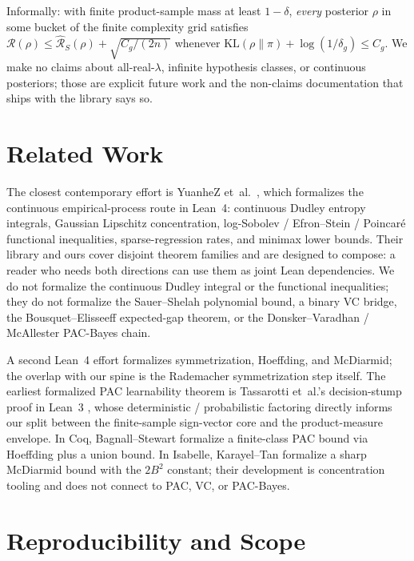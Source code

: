 \documentclass[10pt,twocolumn,letterpaper]{article}
\newcommand{\Risk}{\mathcal{R}}
\newcommand{\eRisk}{\widehat{\mathcal{R}}}
\newcommand{\KL}{\mathrm{KL}}
\begin{document}
\noindent
Informally: with finite product-sample mass at least $1-\delta$,
\emph{every} posterior $\rho$ in some bucket of the finite complexity
grid satisfies
$\Risk(\rho) \le \eRisk_S(\rho) + \sqrt{C_g/(2n)}$
whenever $\KL(\rho\|\pi) + \log(1/\delta_g) \le C_g$. We make no
claims about all-real-$\lambda$, infinite hypothesis classes, or
continuous posteriors; those are explicit future work and the
non-claims documentation that ships with the library says so.

\section{Related Work}
\label{sec:related}

The closest contemporary effort is YuanheZ et~al.\ \cite{YuanheZ2026},
which formalizes the continuous empirical-process route in Lean~4:
continuous Dudley entropy integrals, Gaussian Lipschitz concentration,
log-Sobolev / Efron--Stein / Poincar\'e functional inequalities,
sparse-regression rates, and minimax lower bounds. Their library and
ours cover disjoint theorem families and are designed to compose: a
reader who needs both directions can use them as joint Lean
dependencies. We do not formalize the continuous Dudley integral or
the functional inequalities; they do not formalize the Sauer--Shelah
polynomial bound, a binary VC bridge, the Bousquet--Elisseeff
expected-gap theorem, or the Donsker--Varadhan / McAllester PAC-Bayes
chain.

A second Lean~4 effort \cite{MohanadAhmed2025} formalizes
symmetrization, Hoeffding, and McDiarmid; the overlap with our spine
is the Rademacher symmetrization step itself. The earliest formalized
PAC learnability theorem is Tassarotti et~al.'s decision-stump proof
in Lean~3 \cite{Tassarotti2021}, whose deterministic / probabilistic
factoring directly informs our split between the finite-sample
sign-vector core and the product-measure envelope. In Coq,
Bagnall--Stewart \cite{BagnallStewart2019} formalize a finite-class
PAC bound via Hoeffding plus a union bound. In Isabelle, Karayel--Tan
\cite{KarayelTan2023} formalize a sharp McDiarmid bound with the
$2B^2$ constant; their development is concentration tooling and does
not connect to PAC, VC, or PAC-Bayes.

\section{Reproducibility and Scope}
\label{sec:scope}
\end{document}
